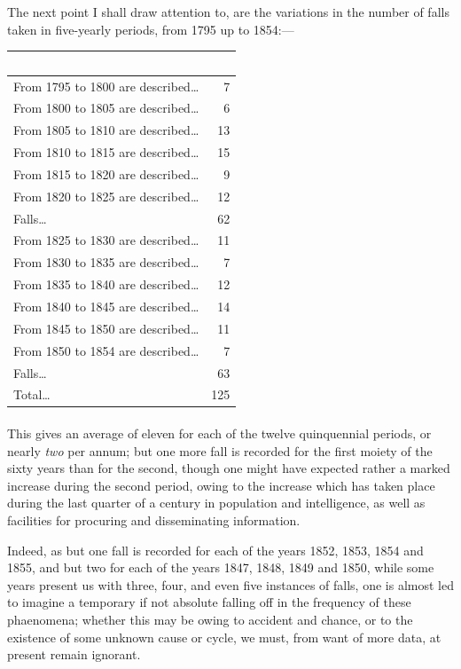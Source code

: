 \documentclass[a4paper, 12pt, oneside]{article}
\begin{document}
The next point I shall draw attention to, are the variations in the number of falls taken in five-yearly periods, from 1795 up to 1854:---
\begin{table}[H]
    \centering
    \bfseries
    \Fontauri
    \begin{tabular}{l r}
         ~ & ~ \\ \hline
        From 1795 to 1800 are described… & 7 \\ \hline
        From 1800 to 1805 are described… & 6 \\ \hline
        From 1805 to 1810 are described… & 13 \\ \hline
        From 1810 to 1815 are described… & 15 \\ \hline
        From 1815 to 1820 are described… & 9 \\ \hline
        From 1820 to 1825 are described… & 12 \\ \hline \hline
        Falls… & 62 \\ \hline \hline
        From 1825 to 1830 are described… & 11 \\ \hline
        From 1830 to 1835 are described… & 7 \\ \hline
        From 1835 to 1840 are described… & 12 \\ \hline
        From 1840 to 1845 are described… & 14 \\ \hline
        From 1845 to 1850 are described… & 11 \\ \hline
        From 1850 to 1854 are described… & 7 \\ \hline \hline
        Falls… & 63 \\ \hline \hline
        Total… & 125 \\ \hline
    \end{tabular}
\end{table}
\paragraph{}
This gives an average of eleven for each of the twelve quinquennial periods, or nearly \emph{two} per annum; but one more fall is recorded for the first moiety of the sixty years than for the second, though one might have expected rather a marked increase during the second period, owing to the increase which has taken place during the last quarter of a century in population and intelligence, as well as facilities for procuring and disseminating information.

Indeed, as but one fall is recorded for each of the years 1852, 1853, 1854 and 1855, and but two for each of the years 1847, 1848, 1849 and 1850, while some years present us with three, four, and even five instances of falls, one is almost led to imagine a temporary if not absolute falling off in the frequency of these phaenomena; whether this may be owing to accident and chance, or to the existence of some unknown cause or cycle, we must, from want of more data, at present remain ignorant.
\end{document}
